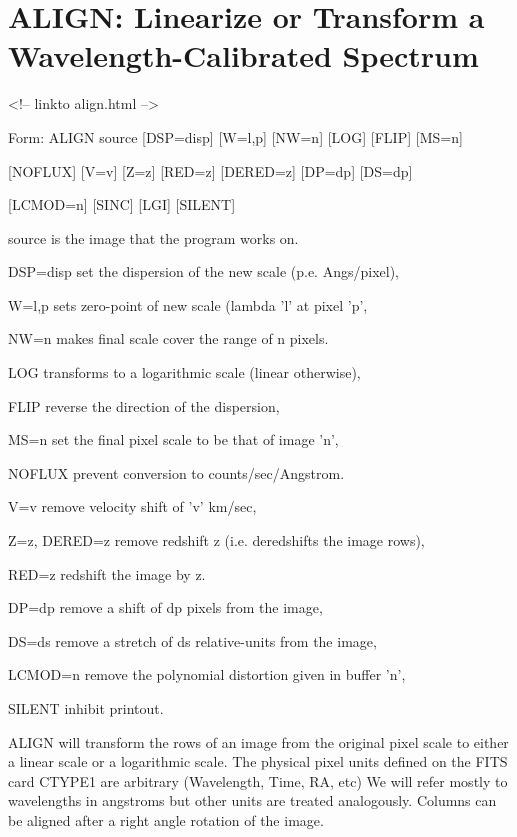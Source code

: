 \section{ALIGN: Linearize or Transform a Wavelength-Calibrated Spectrum}
\begin{rawhtml}
<!-- linkto align.html -->
\end{rawhtml}
\begin{command}
  \item[Form: ALIGN source {[DSP=disp]} {[W=l,p]} {[NW=n]} {[LOG]} 
       {[FLIP]} {[MS=n]}\hfill]{}
  \item{{[NOFLUX]} {[V=v]} {[Z=z]} {[RED=z]} {[DERED=z]} {[DP=dp]} {[DS=dp]}}
  \item{{[LCMOD=n]} {[SINC]} {[LGI]} {[SILENT]}}
  \item[source]{is the image that the program works on.}
  \item[DSP=disp]{set the dispersion of the new scale (p.e. Angs/pixel),}
  \item[W=l,p]{sets zero-point of new scale (lambda 'l' at pixel 'p',}
  \item[NW=n]{makes final scale cover the range of n pixels.}
  \item[LOG]{transforms to a logarithmic scale (linear otherwise),}
  \item[FLIP]{reverse the direction of the dispersion,}
  \item[MS=n]{set the final pixel scale to be that of image 'n',}
  \item[NOFLUX]{prevent conversion to counts/sec/Angstrom.}
  \item[V=v]{remove velocity shift of 'v' km/sec,}
  \item[Z=z, DERED=z]{remove redshift z (i.e. deredshifts the image rows),}
  \item[RED=z]{redshift the image by z.}
  \item[DP=dp]{remove a shift of dp pixels from the image,}
  \item[DS=ds]{remove a stretch of ds relative-units from the image,}
  \item[LCMOD=n]{remove the polynomial distortion given in buffer 'n',}
  \item[SILENT]{inhibit printout.}
\end{command}

ALIGN will transform the rows of an image from the original pixel scale to
either a linear scale or a logarithmic scale. The physical pixel units
defined on the FITS card CTYPE1 are arbitrary (Wavelength, Time, RA, etc)
We will refer mostly to wavelengths in angstroms but other units are
treated analogously. Columns can be aligned after a right angle rotation of
the image.
 
